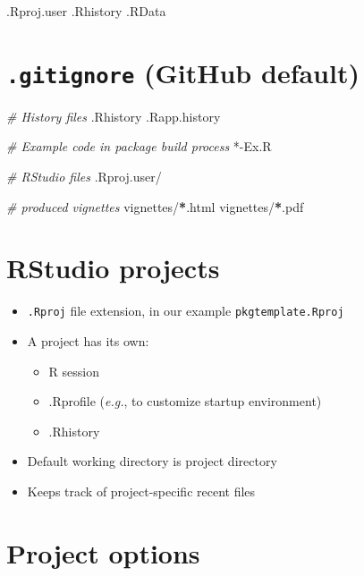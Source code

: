 \documentclass[]{book}
\newenvironment{Shaded}{\begin{snugshade}}{\end{snugshade}}
\newcommand{\CommentTok}[1]{\textcolor[rgb]{0.56,0.35,0.01}{\textit{{#1}}}}
\newcommand{\ErrorTok}[1]{\textcolor[rgb]{0.64,0.00,0.00}{\textbf{{#1}}}}
\newcommand{\NormalTok}[1]{{#1}}
\providecommand{\tightlist}{%
  \setlength{\itemsep}{0pt}\setlength{\parskip}{0pt}}
\theoremstyle{definition}
\theoremstyle{definition}
\theoremstyle{definition}
\theoremstyle{remark}
\begin{document}
\begin{Shaded}
\begin{Highlighting}[]
\NormalTok{.Rproj.user}
\NormalTok{.Rhistory}
\NormalTok{.RData}
\end{Highlighting}
\end{Shaded}

\section{\texorpdfstring{\texttt{.gitignore} (GitHub
default)}{.gitignore (GitHub default)}}\label{gitignore-github-default}

\begin{Shaded}
\begin{Highlighting}[]
\CommentTok{# History files}
\NormalTok{.Rhistory}
\NormalTok{.Rapp.history}

\CommentTok{# Example code in package build process}
\NormalTok{*-Ex.R}

\CommentTok{# RStudio files}
\NormalTok{.Rproj.user/}

\CommentTok{# produced vignettes}
\NormalTok{vignettes/}\ErrorTok{*}\NormalTok{.html}
\NormalTok{vignettes/}\ErrorTok{*}\NormalTok{.pdf}
\end{Highlighting}
\end{Shaded}

\section{RStudio projects}\label{rstudio-projects}

\begin{itemize}
\item
  \texttt{.Rproj} file extension, in our example
  \texttt{pkgtemplate.Rproj}
\item
  A project has its own:

  \begin{itemize}
  \tightlist
  \item
    R session
  \item
    .Rprofile (\emph{e.g.}, to customize startup environment)
  \item
    .Rhistory
  \end{itemize}
\item
  Default working directory is project directory
\item
  Keeps track of project-specific recent files
\end{itemize}

\section{Project options}\label{project-options}
\end{document}
